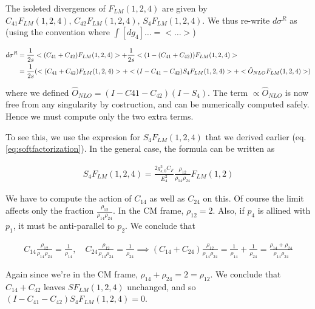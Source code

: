 \documentclass[11pt]{report}
\begin{document}
The isoleted divergences of \(F_{LM}(1, 2, 4)\) are given by \(C_{41}F_{LM}(1, 2, 4), \, C_{42}F_{LM}(1, 2, 4), \, S_4F_{LM}(1, 2, 4)\). We thus re-write \(d\sigma^R\) as (using the convention where \(\int [dg_4] \ldots = <\ldots> \))

\begin{align}
    d\sigma^R &= \frac{1}{2s}<(C_{41}+C_{42})F_{LM}(1, 2, 4)> + \frac{1}{2s}<(1 - (C_{41}+C_{42}))F_{LM}(1, 2, 4)> \notag \\ 
    &= \frac{1}{2s}(<(C_{41} + C_{42})F_{LM}(1, 2, 4)> + <(I - C_{41} - C_{42})S_4F_{LM}(1, 2, 4)> + <\hat{O}_{NLO}F_{LM}(1, 2, 4)>) 
\end{align}

where we defined \(\hat{O}_{NLO} = (I-C{41}- C_{42})(I-S_4)\). The term \(\propto \hat{O}_{NLO}\) is now free from any singularity by costruction, and can be numerically computed safely. Hence we must compute only the two extra terms. 


To see this, we use the expresion for \(S_4 F_{LM}(1, 2, 4)\) that we derived earlier (eq. \ref{eq:softfactorization}). In the general case, the formula can be written as 

\begin{align}
    S_4 F_{LM}(1, 2, 4) = \frac{2g_{s,b}^2 C_F}{E_4^2}\frac{\rho_{12}}{\rho_{14}\rho_{24}}F_{LM}(1, 2)
\end{align}

We have to compute the action of \(C_{14}\) as well as \(C_{24}\) on this. Of course the limit affects only the fraction \(\frac{\rho_{12}}{\rho_{14}\rho_{24}}\). In the CM frame, \(\rho_{12} = 2\). Also, if \(p_4\) is allined with \(p_1\), it must be anti-parallel to \(p_2\). We conclude that 

\begin{align}
    C_{14}\frac{\rho_{12}}{\rho_{14}\rho_{24}} = \frac{1}{\rho_{14}}, \quad C_{24}\frac{\rho_{12}}{\rho_{14}\rho_{24}} = \frac{1}{\rho_{24}} \implies (C_{14} + C_{24}) \frac{\rho_{12}}{\rho_{14}\rho_{24}} = \frac{1}{\rho_{14}} + \frac{1}{\rho_{24}} = \frac{\rho_{14} + \rho_{24}}{\rho_{14}\rho_{24}}
\end{align}

Again since we're in the CM frame, \(\rho_{14} + \rho_{24} = 2 = \rho_{12}\). We conclude that \(C_{14} + C_{42}\) leaves \(SF_{LM}(1, 2, 4)\) unchanged, and so \((I - C_{41} - C_{42})S_4F_{LM}(1, 2, 4) = 0\). 
\end{document}
